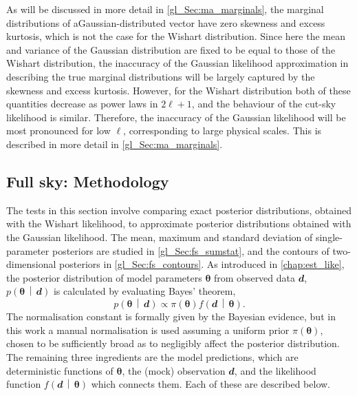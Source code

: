 As will be discussed in more detail in \autoref{gl_Sec:ma_marginals}, the marginal distributions of a\linebreak Gaussian-distributed vector have zero skewness and excess kurtosis, which is not the case for the Wishart distribution. Since here the mean and variance of the Gaussian distribution are fixed to be equal to those of the Wishart distribution, the inaccuracy of the Gaussian likelihood approximation in describing the true marginal distributions will be largely captured by the skewness and excess kurtosis. However, for the Wishart distribution both of these quantities decrease as power laws in $2 \ell + 1$, and the behaviour of the cut-sky likelihood is similar. Therefore, the inaccuracy of the Gaussian likelihood will be most pronounced for low $\ell$, corresponding to large physical scales. This is described in more detail in \autoref{gl_Sec:ma_marginals}.

\subsection{Full sky: Methodology}
\label{gl_Sec:fs_method}

The tests in this section involve comparing exact posterior distributions, obtained with the Wishart likelihood, to approximate posterior distributions obtained with the Gaussian likelihood. The mean, maximum and standard deviation of single-parameter posteriors are studied in \autoref{gl_Sec:fs_sumstat}, and the contours of two-dimensional posteriors in \autoref{gl_Sec:fs_contours}. As introduced in \autoref{chap:est_like}, the posterior distribution of model parameters $\bm{\theta}$ from observed data $\mathbfit{d}$, $p \left( \bm{\theta} \,\middle|\, \mathbfit{d} \right)$ is calculated by evaluating Bayes' theorem,
\begin{equation}
p \left( \bm{\theta} \,\middle|\, \mathbfit{d} \right)
\propto \pi \left( \bm{\theta} \right)
f \left( \mathbfit{d} \,\middle|\, \bm{\theta} \right).
\end{equation}
The normalisation constant is formally given by the Bayesian evidence, but in this work a manual normalisation is used assuming a uniform prior $\pi \left( \bm{\theta} \right)$, chosen to be sufficiently broad as to negligibly affect the posterior distribution. The remaining three ingredients are the model predictions, which are deterministic functions of $\bm{\theta}$, the (mock) observation $\mathbfit{d}$, and the likelihood function $f \left( \mathbfit{d} \,\middle|\, \bm{\theta} \right)$ which connects them. Each of these are described below.

